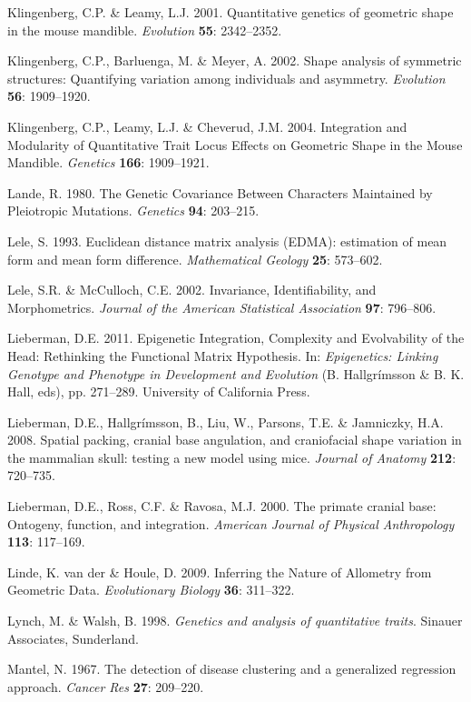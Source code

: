 \documentclass[12pt,]{article}
\begin{document}
Klingenberg, C.P. \& Leamy, L.J. 2001. Quantitative genetics of
geometric shape in the mouse mandible. \emph{Evolution} \textbf{55}:
2342--2352.

Klingenberg, C.P., Barluenga, M. \& Meyer, A. 2002. Shape analysis of
symmetric structures: Quantifying variation among individuals and
asymmetry. \emph{Evolution} \textbf{56}: 1909--1920.

Klingenberg, C.P., Leamy, L.J. \& Cheverud, J.M. 2004. Integration and
Modularity of Quantitative Trait Locus Effects on Geometric Shape in the
Mouse Mandible. \emph{Genetics} \textbf{166}: 1909--1921.

Lande, R. 1980. The Genetic Covariance Between Characters Maintained by
Pleiotropic Mutations. \emph{Genetics} \textbf{94}: 203--215.

Lele, S. 1993. Euclidean distance matrix analysis (EDMA): estimation of
mean form and mean form difference. \emph{Mathematical Geology}
\textbf{25}: 573--602.

Lele, S.R. \& McCulloch, C.E. 2002. Invariance, Identifiability, and
Morphometrics. \emph{Journal of the American Statistical Association}
\textbf{97}: 796--806.

Lieberman, D.E. 2011. Epigenetic Integration, Complexity and
Evolvability of the Head: Rethinking the Functional Matrix Hypothesis.
In: \emph{Epigenetics: Linking Genotype and Phenotype in Development and
Evolution} (B. Hallgrímsson \& B. K. Hall, eds), pp. 271--289.
University of California Press.

Lieberman, D.E., Hallgrímsson, B., Liu, W., Parsons, T.E. \& Jamniczky,
H.A. 2008. Spatial packing, cranial base angulation, and craniofacial
shape variation in the mammalian skull: testing a new model using mice.
\emph{Journal of Anatomy} \textbf{212}: 720--735.

Lieberman, D.E., Ross, C.F. \& Ravosa, M.J. 2000. The primate cranial
base: Ontogeny, function, and integration. \emph{American Journal of
Physical Anthropology} \textbf{113}: 117--169.

Linde, K. van der \& Houle, D. 2009. Inferring the Nature of Allometry
from Geometric Data. \emph{Evolutionary Biology} \textbf{36}: 311--322.

Lynch, M. \& Walsh, B. 1998. \emph{Genetics and analysis of quantitative
traits}. Sinauer Associates, Sunderland.

Mantel, N. 1967. The detection of disease clustering and a generalized
regression approach. \emph{Cancer Res} \textbf{27}: 209--220.
\end{document}
